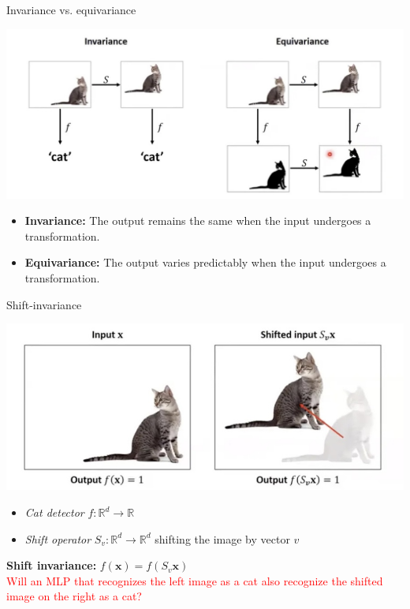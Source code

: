 \documentclass[default, aspectratio=169]{beamer}
\begin{document}
	\begin{frame}{Invariance vs. equivariance}
		\begin{center}
			\includegraphics[keepaspectratio, scale=0.28]{pic/invariance_vs_equivariance.jpg}
		\end{center}
		\begin{itemize}
			\item \textbf{Invariance:} \small The output remains the same when the input undergoes a transformation.
			\item \textbf{Equivariance:} \small The output varies predictably when the input undergoes a transformation.
			
		\end{itemize}
	\end{frame}
	\begin{frame}{Shift-invariance}
		\begin{center}
			\includegraphics[keepaspectratio, scale=0.25]{pic/shift_invariance.jpg}
		\end{center}
		
		\begin{itemize}
			\item \textit{Cat detector} \quad $f: \mathbb{R}^d \to \mathbb{R}$
			
			\item \textit{Shift operator} \quad $S_v: \mathbb{R}^d \to \mathbb{R}^d$ \quad shifting the image by vector $v$
		\end{itemize}
		
		\textbf{Shift invariance:} \quad $f(\mathbf{x}) = f(S_v \mathbf{x})$ 
		\\ \textcolor{red}{Will an MLP that recognizes the left image as a cat also recognize the shifted image on the right as a cat?}
	\end{frame}
\end{document}
